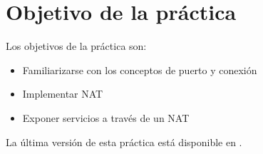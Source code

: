 
\usepackage{eurosym}


\renewcommand{\hmwkClass}{Planificación y Administración de Redes}
\renewcommand{\hmwkTitle}{Práctica de conexiones TCP}

\usepackage{anyfontsize}








\primerapagina

\setlength{\parindent}{0em}
\setlength{\parskip}{1em}


\section{Objetivo de la práctica}
Los objetivos  de la práctica son:
\begin{itemize}
\item Familiarizarse con los conceptos de puerto y conexión
\item Implementar NAT
\item Exponer servicios a través de un NAT
\end{itemize}


La última versión de esta práctica está disponible en .


